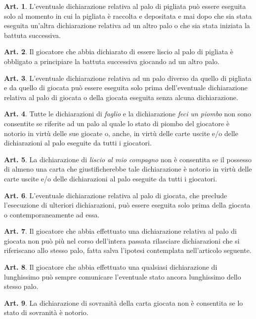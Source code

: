 \documentclass[italian,a4paper]{book}
\theoremstyle{definition}
\newtheorem{art}{Art.}
\begin{document}
\begin{art}
L'eventuale dichiarazione relativa al palo di pigliata può essere eseguita solo al momento in cui la pigliata è raccolta e depositata e mai dopo che sia stata eseguita un'altra dichiarazione relativa ad un altro palo o che sia stata iniziata la battuta successiva.
\end{art}
\begin{art}
Il giocatore che abbia dichiarato di essere liscio al palo di pigliata è obbligato a principiare la battuta successiva giocando ad un altro palo.
\end{art}
\begin{art}
L'eventuale dichiarazione relativa ad un palo diverso da quello di pigliata e da quello di giocata può essere eseguita solo prima dell'eventuale dichiarazione relativa al palo di giocata o della giocata eseguita senza alcuna dichiarazione.
\end{art}
\begin{art}
Tutte le dichiarazioni di \emph{faglio} e la dichiarazione \emph{feci un piombo} non sono consentite se riferite ad un palo al quale lo stato di piombo del giocatore è notorio in virtù delle sue giocate o, anche, in virtù delle carte uscite e/o delle dichiarazioni al palo eseguite da tutti i giocatori.
\end{art}
\begin{art}
La dichiarazione di \emph{liscio al mio compagno} non è consentita se il possesso di almeno una carta che giustificherebbe tale dichiarazione è notorio in virtù delle carte uscite e/o delle dichiarazioni al palo eseguite da tutti i giocatori.
\end{art}
\begin{art}
L'eventuale dichiarazione relativa al palo di giocata, che preclude l'esecuzione di ulteriori dichiarazioni, può essere eseguita solo prima della giocata o contemporaneamente ad essa.
\end{art}
\begin{art}
Il giocatore che abbia effettuato una dichiarazione relativa al palo di giocata non può più nel corso dell'intera passata rilasciare dichiarazioni che si riferiscano allo stesso palo, fatta salva l'ipotesi contemplata nell'articolo seguente.
\end{art}
\begin{art}
Il giocatore che abbia effettuato una qualsiasi dichiarazione di lunghissimo può sempre comunicare l'eventuale stato ancora lunghissimo dello stesso palo.
\end{art}
\begin{art}
La dichiarazione di sovranità della carta giocata non è consentita se lo stato di sovranità è notorio.
\end{art}
\end{document}
